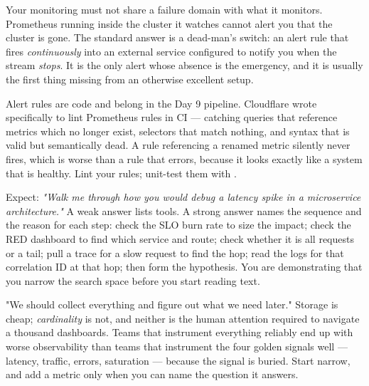 \begin{drtip}
Your monitoring must not share a failure domain with what it monitors. Prometheus running inside the cluster it watches cannot alert you that the cluster is gone. The standard answer is a dead-man's switch: an alert rule that fires \emph{continuously} into an external service configured to notify you when the stream \emph{stops}. It is the only alert whose absence is the emergency, and it is usually the first thing missing from an otherwise excellent setup.
\end{drtip}

\begin{autotip}
Alert rules are code and belong in the Day 9 pipeline. Cloudflare wrote  specifically to lint Prometheus rules in CI --- catching queries that reference metrics which no longer exist, selectors that match nothing, and syntax that is valid but semantically dead. A rule referencing a renamed metric silently never fires, which is worse than a rule that errors, because it looks exactly like a system that is healthy. Lint your rules; unit-test them with .
\end{autotip}

\begin{interview}
Expect: \emph{"Walk me through how you would debug a latency spike in a microservice architecture."} A weak answer lists tools. A strong answer names the sequence and the reason for each step: check the SLO burn rate to size the impact; check the RED dashboard to find which service and route; check whether it is all requests or a tail; pull a trace for a slow request to find the hop; read the logs for that correlation ID at that hop; then form the hypothesis. You are demonstrating that you narrow the search space before you start reading text.
\end{interview}

\begin{misconception}
"We should collect everything and figure out what we need later." Storage is cheap; \emph{cardinality} is not, and neither is the human attention required to navigate a thousand dashboards. Teams that instrument everything reliably end up with worse observability than teams that instrument the four golden signals well --- latency, traffic, errors, saturation --- because the signal is buried. Start narrow, and add a metric only when you can name the question it answers.
\end{misconception}


